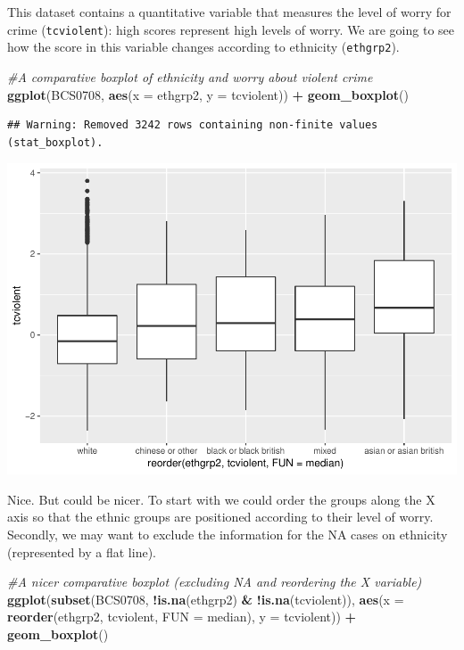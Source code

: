 \documentclass[]{book}
\newenvironment{Shaded}{\begin{snugshade}}{\end{snugshade}}
\newcommand{\CommentTok}[1]{\textcolor[rgb]{0.56,0.35,0.01}{\textit{#1}}}
\newcommand{\DataTypeTok}[1]{\textcolor[rgb]{0.13,0.29,0.53}{#1}}
\newcommand{\KeywordTok}[1]{\textcolor[rgb]{0.13,0.29,0.53}{\textbf{#1}}}
\newcommand{\NormalTok}[1]{#1}
\newcommand{\OperatorTok}[1]{\textcolor[rgb]{0.81,0.36,0.00}{\textbf{#1}}}
\newcommand{\StringTok}[1]{\textcolor[rgb]{0.31,0.60,0.02}{#1}}
\theoremstyle{definition}
\theoremstyle{definition}
\theoremstyle{definition}
\theoremstyle{remark}
\begin{document}
This dataset contains a quantitative variable that measures the level of
worry for crime (\texttt{tcviolent}): high scores represent high levels
of worry. We are going to see how the score in this variable changes
according to ethnicity (\texttt{ethgrp2}).

\begin{Shaded}
\begin{Highlighting}[]
\CommentTok{#A comparative boxplot of ethnicity and worry about violent crime}
\KeywordTok{ggplot}\NormalTok{(BCS0708, }\KeywordTok{aes}\NormalTok{(}\DataTypeTok{x =}\NormalTok{ ethgrp2, }\DataTypeTok{y =}\NormalTok{ tcviolent)) }\OperatorTok{+}
\StringTok{  }\KeywordTok{geom_boxplot}\NormalTok{()}
\end{Highlighting}
\end{Shaded}

\begin{verbatim}
## Warning: Removed 3242 rows containing non-finite values (stat_boxplot).
\end{verbatim}

\includegraphics{03-visualisation_files/figure-latex/unnamed-chunk-33-1.pdf}

Nice. But could be nicer. To start with we could order the groups along
the X axis so that the ethnic groups are positioned according to their
level of worry. Secondly, we may want to exclude the information for the
NA cases on ethnicity (represented by a flat line).

\begin{Shaded}
\begin{Highlighting}[]
\CommentTok{#A nicer comparative boxplot (excluding NA and reordering the X variable)}
\KeywordTok{ggplot}\NormalTok{(}\KeywordTok{subset}\NormalTok{(BCS0708, }\OperatorTok{!}\KeywordTok{is.na}\NormalTok{(ethgrp2) }\OperatorTok{&}\StringTok{ }\OperatorTok{!}\KeywordTok{is.na}\NormalTok{(tcviolent)), }
       \KeywordTok{aes}\NormalTok{(}\DataTypeTok{x =} \KeywordTok{reorder}\NormalTok{(ethgrp2, tcviolent, }\DataTypeTok{FUN =}\NormalTok{ median), }\DataTypeTok{y =}\NormalTok{ tcviolent)) }\OperatorTok{+}
\StringTok{        }\KeywordTok{geom_boxplot}\NormalTok{()}
\end{Highlighting}
\end{Shaded}
\end{document}
